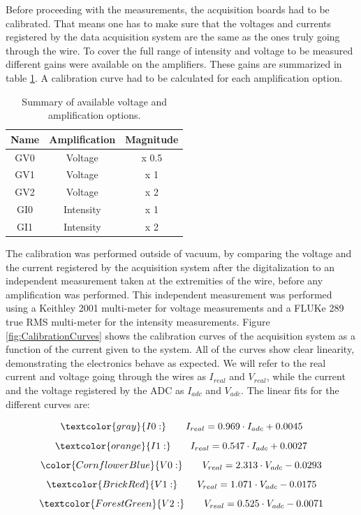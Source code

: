 Before proceeding with the measurements, the acquisition boards had to be calibrated. That means one has to make sure that the voltages and currents registered by the data acquisition system are the same as the ones truly going through the wire. To cover the full range of intensity and voltage to be measured different gains were available on the amplifiers. These gains are summarized in table \ref{tab:AvGains}. A calibration curve had to be calculated for each amplification option. 

\begin{table}[h]
    \centering
    \begin{tabular}{ccc}
    \hline
    Name & Amplification & Magnitude \\ \hline
    GV0  & Voltage       & x 0.5     \\
    GV1  & Voltage       & x 1       \\
    GV2  & Voltage       & x 2       \\
    GI0  & Intensity     & x 1       \\
    GI1  & Intensity     & x 2       \\ \hline
    \end{tabular}
    \caption{Summary of available voltage and amplification options. }
    \label{tab:AvGains}
\end{table}

The calibration was performed outside of vacuum, by comparing the voltage and the current registered by the acquisition system after the digitalization to an independent measurement taken at the extremities of the wire, before any amplification was performed. This independent measurement was performed using a Keithley 2001 multi-meter for voltage measurements and a FLUKe 289 true RMS multi-meter for the intensity measurements. Figure \ref{fig:CalibrationCurves} shows the calibration curves of the acquisition system as a function of the current given to the system. All of the curves show clear linearity, demonstrating the electronics behave as expected. We will refer to the real current and voltage going through the wires as $I_{real}$ and $V_{real}$, while the current and the voltage registered by the ADC as $I_{adc}$ and $V_{adc}$. The linear fits for the different curves are: 

\begin{equation}
    \textcolor{gray}{I0:} \qquad I_{real} = 0.969 \cdot I_{adc} + 0.0045
\end{equation}
\begin{equation}
    \textcolor{orange}{I1:} \qquad I_{real} = 0.547 \cdot I_{adc} + 0.0027
\end{equation}
\begin{equation}
    {\color{CornflowerBlue}{V0:} }\qquad V_{real} = 2.313 \cdot V_{adc} - 0.0293
\end{equation}
\begin{equation}
    \textcolor{BrickRed}{V1:} \qquad V_{real} = 1.071 \cdot V_{adc} - 0.0175
\end{equation}
\begin{equation}
    \textcolor{ForestGreen}{V2:} \qquad V_{real} = 0.525 \cdot V_{adc} - 0.0071
\end{equation}
    
